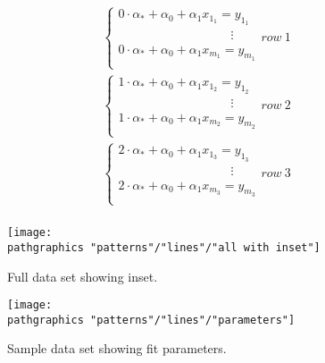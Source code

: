   \begin{equation}
    \begin{split}
      \begin{cases}
        0\cdot\alpha_{*} + \alpha_{0} + \alpha_{1} x_{1_{1}} = y_{1_{1}} \\
        \qquad \qquad \qquad \qquad \quad \vdots \\
        0\cdot\alpha_{*} + \alpha_{0} + \alpha_{1} x_{m_{1}} = y_{m_{1}} \\
      \end{cases}
      row\ 1 \\
      \begin{cases}
        1\cdot\alpha_{*} + \alpha_{0} + \alpha_{1} x_{1_{2}} = y_{1_{2}} \\
        \qquad \qquad \qquad \qquad \quad \vdots \\
        1\cdot\alpha_{*} + \alpha_{0} + \alpha_{1} x_{m_{2}} = y_{m_{2}} \\
      \end{cases}
      row\ 2 \\
      \begin{cases}
        2\cdot\alpha_{*} + \alpha_{0} + \alpha_{1} x_{1_{3}} = y_{1_{3}} \\
        \qquad \qquad \qquad \qquad \quad \vdots \\
        2\cdot\alpha_{*} + \alpha_{0} + \alpha_{1} x_{m_{3}} = y_{m_{3}} \\
      \end{cases}
      row\ 3 \\
    \end{split}
  \label{eq:system}
  \end{equation}

\begin{figure}[htbp] %
   \centering
   \texttt{[image: \\pathgraphics "patterns"/"lines"/"all with inset"]} 
   \caption{Full data set showing inset.}
   \label{fig:simulation inset}
\end{figure}

\begin{figure}[htbp] %
   \centering
   \texttt{[image: \\pathgraphics "patterns"/"lines"/"parameters"]} 
   \caption{Sample data set showing fit parameters.}
   \label{fig:parameters}
\end{figure}
\clearpage

